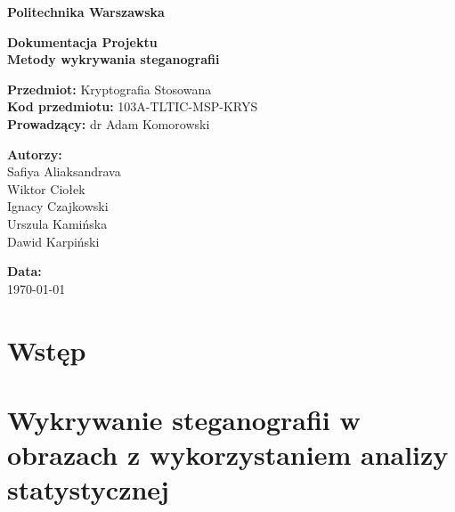 \documentclass[a4paper,12pt]{article}
\begin{document}
\begin{titlepage}
	\begin{center}
		\vspace*{1cm}

		\textbf{\Huge Politechnika Warszawska}\\
		\vspace{2cm}

		\textbf{\LARGE Dokumentacja Projektu}\\
		\vspace{0.5cm}
		\textbf{\Large Metody wykrywania steganografii}\\

		\vspace{2cm}

		\textbf{Przedmiot:} Kryptografia Stosowana \\
		\textbf{Kod przedmiotu:} 103A-TLTIC-MSP-KRYS \\
		\textbf{Prowadzący:} dr Adam Komorowski \\

		\vfill

		\textbf{Autorzy:}\\
		\vspace{0.5cm}
		Safiya Aliaksandrava\\
		Wiktor Ciołek\\
		Ignacy Czajkowski\\
		Urszula Kamińska\\
		Dawid Karpiński\\

		\vspace{1cm}

		\textbf{Data:} \\
		\today

		\vspace{2cm}
	\end{center}
\end{titlepage}

\tableofcontents
\clearpage

\section{Wstęp}



\clearpage
\section{Wykrywanie steganografii w obrazach z wykorzystaniem analizy statystycznej}

\end{document}
